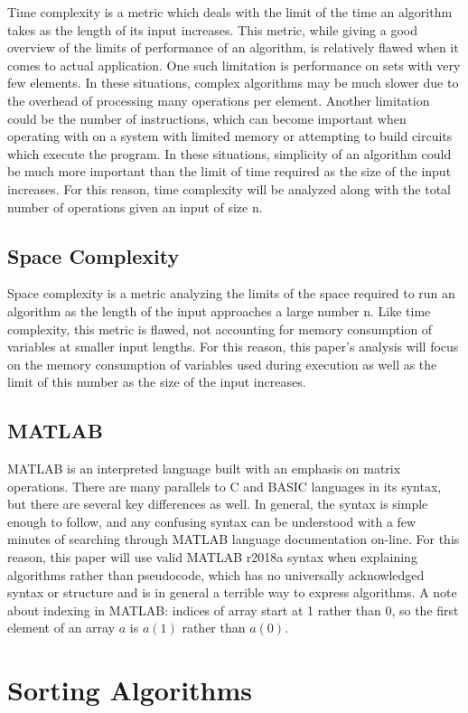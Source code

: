 \documentclass[a4paper]{article}
\begin{document}
Time complexity is a metric which deals with the limit of the time an algorithm takes as the length of its input increases. This metric, while giving a good overview of the limits of performance of an algorithm, is relatively flawed when it comes to actual application. One such limitation is performance on sets with very few elements. In these situations, complex algorithms may be much slower due to the overhead of processing many operations per element. Another limitation could be the number of instructions, which can become important when operating with on a system with limited memory or attempting to build circuits which execute the program. In these situations, simplicity of an algorithm could be much more important than the limit of time required as the size of the input increases. For this reason, time complexity will be analyzed along with the total number of operations given an input of size n. 

\subsection{Space Complexity}
Space complexity is a metric analyzing the limits of the space required to run an algorithm as the length of the input approaches a large number n. Like time complexity, this metric is flawed, not accounting for memory consumption of variables at smaller input lengths. For this reason, this paper’s analysis will focus on the memory consumption of variables used during execution as well as the limit of this number as the size of the input increases.

\subsection{MATLAB}
MATLAB is an interpreted language built with an emphasis on matrix operations. There are many parallels to C and BASIC languages in its syntax, but there are several key differences as well. In general, the syntax is simple enough to follow, and any confusing syntax can be understood with a few minutes of searching through MATLAB language documentation on-line. For this reason, this paper will use valid MATLAB r2018a syntax when explaining algorithms rather than pseudocode, which has no universally acknowledged syntax or structure and is in general a terrible way to express algorithms. A note about indexing in MATLAB: indices of array start at 1 rather than 0, so the first element of an array $a$ is $a(1)$ rather than $a(0)$.

\section{Sorting Algorithms}
\end{document}
